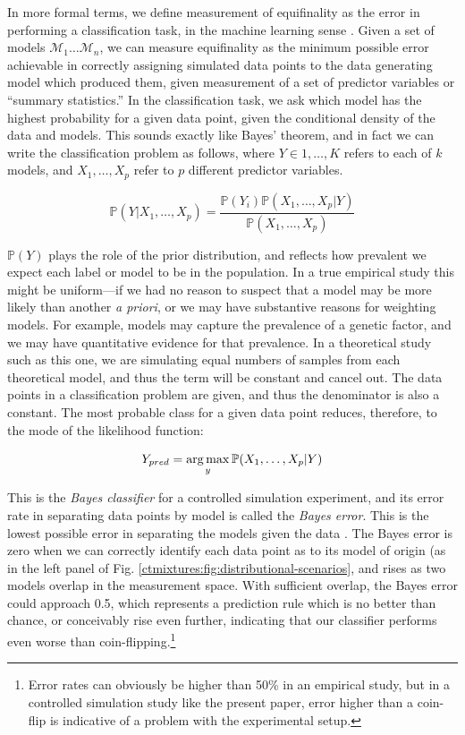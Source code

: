 In more formal terms, we define measurement of equifinality as the error in performing a classification task, in the machine learning sense \citep{murphy2012machine}.  Given a set
of models \(\mathcal{M}_1 \ldots \mathcal{M}_n\), we can measure
equifinality as the minimum possible error achievable in correctly
assigning simulated data points to the data generating model which produced them,
given measurement of a set of predictor variables or ``summary statistics.'' In the classification task, we ask which model has the highest probability for
a given data point, given the conditional density of the data and
models. This sounds exactly like Bayes' theorem, and in fact we can
write the classification problem as follows, where
\(Y \in 1, \ldots, K\) refers to each of \(k\) models, and
\(X_1, \ldots, X_p\) refer to \(p\) different predictor variables.

\begin{equation}
\mathbb{P}(Y | X_1, \ldots, X_p) = \frac{\mathbb{P}(Y_i) \mathbb{P}(X_1, \ldots, X_p | Y)}{\mathbb{P}(X_1, \ldots, X_p)}
\label{eq:bayes-rule-classification}
\end{equation}

\(\mathbb{P}(Y)\) plays the role of the prior distribution, and reflects how prevalent we expect each label or model to be in the population.  In a true empirical study this might be uniform---if we had no reason to suspect that a model may be more likely than another \emph{a priori}, or we may have substantive reasons for weighting models.  For example, models may capture the prevalence of a genetic factor, and we may have quantitative evidence for that prevalence.  In a theoretical study such as this one, we are simulating equal numbers of samples from each theoretical model, and thus the term will be constant and cancel out.  The data points in a classification problem are given, and
thus the denominator is also a constant. The most probable class for a given
data point reduces, therefore, to the mode of the likelihood function:

\begin{equation}
Y_{pred} = \operatorname*{arg\,max}_y \mathbb{P}(X_1, \ldots, X_p | Y)
\label{eq:map-class-bayes}
\end{equation}

This is the \emph{Bayes classifier} for a controlled simulation
experiment, and its error rate in separating data points by model is
called the \emph{Bayes error}. This is the lowest possible error in
separating the models given the data
\citep{devijver1982pattern, fukunaga1990introduction, hastie2009elements}.
The Bayes error is zero when we can correctly identify each data point
as to its model of origin (as in the left panel of Fig. \ref{ctmixtures:fig:distributional-scenarios}, and rises as two models overlap in the
measurement space. With sufficient overlap, the Bayes error could
approach 0.5, which represents a prediction rule which is no better than
chance, or conceivably rise even further, indicating that our classifier performs even worse than coin-flipping.\footnote{Error rates can obviously be higher than 50\% in an empirical study, but in a controlled simulation study like the present paper, error higher than a coin-flip is indicative of a problem with the experimental setup.}

